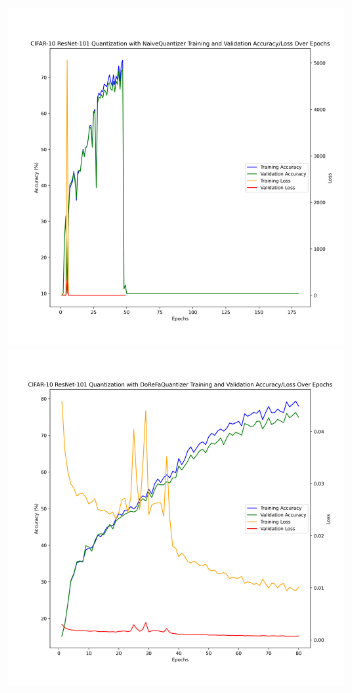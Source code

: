 \documentclass{article}
\begin{document}
\begin{figure}
	\centerline{\includegraphics[width=3.5in]{../proj2/figures/cifar10_resnet101_NaiveQuantizer.png}\includegraphics[width=3.5in]{../proj2/figures/cifar10_resnet101_DoReFaQuantizer.png}}

\end{figure}
\end{document}

